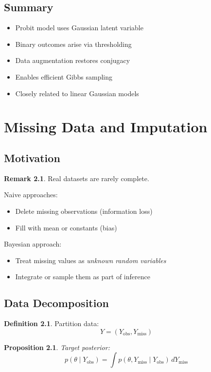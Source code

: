 \documentclass[12pt,oneside]{book}
\numberwithin{equation}{section}
\theoremstyle{definition}
\newtheorem{definition}{Definition}[section]
\newtheorem{remark}{Remark}[section]
\theoremstyle{plain}
\newtheorem{proposition}{Proposition}[section]
\theoremstyle{remark}
\begin{document}
\section{Summary}

\begin{itemize}
\item Probit model uses Gaussian latent variable
\item Binary outcomes arise via thresholding
\item Data augmentation restores conjugacy
\item Enables efficient Gibbs sampling
\item Closely related to linear Gaussian models
\end{itemize}

\chapter{Missing Data and Imputation}

\section{Motivation}

\begin{remark}
Real datasets are rarely complete.

Naive approaches:
\begin{itemize}
\item Delete missing observations (information loss)
\item Fill with mean or constants (bias)
\end{itemize}

Bayesian approach:
\begin{itemize}
\item Treat missing values as \emph{unknown random variables}
\item Integrate or sample them as part of inference
\end{itemize}
\end{remark}

\section{Data Decomposition}

\begin{definition}
Partition data:
$$
Y = (Y_{\text{obs}}, Y_{\text{miss}})
$$
\end{definition}

\begin{proposition}
Target posterior:
$$
p(\theta \mid Y_{\text{obs}})
=
\int p(\theta, Y_{\text{miss}} \mid Y_{\text{obs}})\, dY_{\text{miss}}
$$
\end{proposition}
\end{document}
